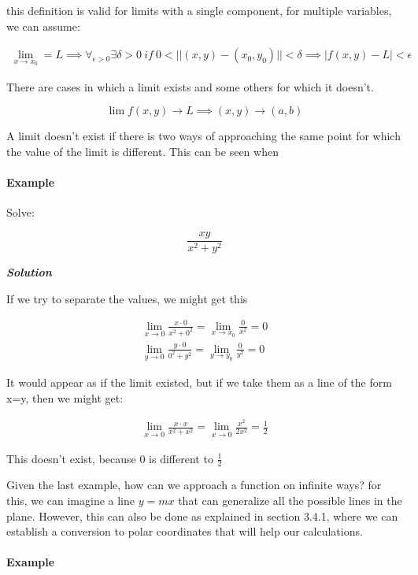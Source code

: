 \documentclass[11pt,fleqn]{book} %
\begin{document}
this definition is valid for limits with a single component, for multiple variables, we can assume:

\begin{gather}
    \lim_{x \to x_0} = L \implies \forall_{\epsilon > 0} \exists \delta > 0 \ if \ 0 < ||(x,y) - (x_0, y_0)|| < \delta \implies |f(x,y) - L| < \epsilon
\end{gather}

There are cases in which a limit exists and some others for which it doesn't. 

$$\lim f(x,y) \to L \implies (x,y) \to (a,b)$$

A limit doesn't exist if there is two ways of approaching the same point
for which the value of the limit is different. This can be seen when 


\paragraph{Example}

Solve:

$$\frac{xy}{x^2 + y^2}$$

\textit{\textbf{Solution}}

If we try to separate the values, we might get this

\begin{gather}
    \lim_{x \to 0} \frac{x \cdot 0}{x^2 + 0^2} = \lim_{x \to x_0} \frac{0}{x^2} = 0\\
    \lim_{y \to 0} \frac{y \cdot 0}{0^2 + y^2} = \lim_{y \to y_0} \frac{0}{y^2} = 0
\end{gather}

It would appear as if the limit existed,
but if we take them as a line of the form x=y, then we might get:

\begin{gather}
    \lim_{x \to 0} \frac{x \cdot x}{x^2 + x^2} = \lim_{x \to 0} \frac{x^2}{2x^2} = \frac{1}{2}  
\end{gather}

This doesn't exist, because 0 is different to $\frac{1}{2}$

Given the last example, how can we approach a function on infinite ways?
for this, we can imagine a line $ y = mx $ that can generalize all the possible lines in the plane. However, this can
also be done as explained in section 3.4.1, where we can establish a conversion to polar coordinates that will help our calculations.

\paragraph{Example}
\end{document}
